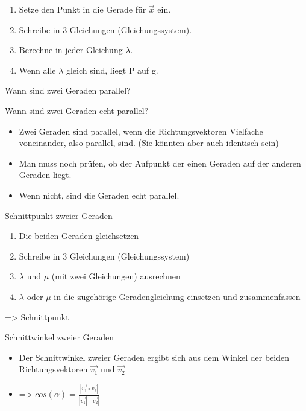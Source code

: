 \documentclass[paper=a6,landscape,ngerman,twoside=true,fontsize=12pt]{scrartcl}
\begin{document}
\begin{antwort}
	\Large	
	\begin{enumerate} 
		\item Setze den Punkt in die Gerade für $\vec{x}$ ein.	
		\item Schreibe in 3 Gleichungen (Gleichungssystem).
		\item Berechne in jeder Gleichung $\lambda$.
		\item Wenn alle $\lambda$ gleich sind, liegt P auf g.
	\end{enumerate} 
		
\end{antwort}	
\begin{frage}
	\LARGE
	Wann sind zwei Geraden parallel?
	
	Wann sind zwei Geraden echt parallel?
	
\end{frage}
\begin{antwort}
	\Large	
	\begin{itemize} 
		\item Zwei Geraden sind parallel, wenn die Richtungsvektoren Vielfache voneinander, also parallel, sind.	
		(Sie könnten aber auch identisch sein)
		\item Man muss noch prüfen, ob der Aufpunkt der einen Geraden auf der anderen Geraden liegt.
		\item Wenn nicht, sind die Geraden echt parallel.
	\end{itemize} 
	
\end{antwort}	
\begin{frage}
	\LARGE
	Schnittpunkt zweier Geraden
	
\end{frage}
\begin{antwort}
	\Large	
	\begin{enumerate} 
		\item Die beiden Geraden gleichsetzen
		\item Schreibe in 3 Gleichungen (Gleichungssystem)
		\item $\lambda$ und $\mu$ (mit zwei Gleichungen) ausrechnen
		\item  $\lambda$ oder $\mu$ in die zugehörige Geradengleichung einsetzen und zusammenfassen
	\end{enumerate} 
	\bigskip
	=> Schnittpunkt
	
\end{antwort}		
\begin{frage}
	\LARGE
	Schnittwinkel zweier Geraden
	
\end{frage}
\begin{antwort}
	\Large	
	\begin{itemize} 
		\item Der Schnittwinkel zweier Geraden ergibt sich aus dem Winkel der beiden Richtungsvektoren $\vec{v_1}$ und $\vec{v_2}$ 
		\item => $cos(\alpha)=\frac{|\vec{v_1} \circ \vec{v_2}|}{|\vec{v_1}|\cdot|\vec{v_2}|}$
	\end{itemize} 
	
\end{antwort}		
\end{document}
